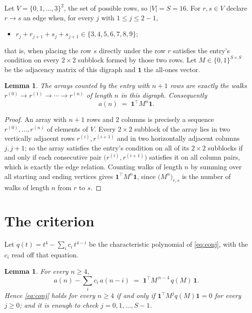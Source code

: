 \documentclass[11pt,a4paper]{article}
\theoremstyle{plain}
\newtheorem{lemma}[theorem]{Lemma}
\theoremstyle{definition}
\begin{document}
Let $V=\{0,1,\dots,3\}^{2}$, the set of possible rows, so $|V|=S=16$. For
$r,s\in V$ declare $r\to s$ an edge when, for every $j$ with $1\le j\le 2-1$,
\begin{itemize}
\item $r_j+r_{j+1}+s_j+s_{j+1}\in\{3, 4, 5, 6, 7, 8, 9\}$;

\end{itemize}
that is, when placing the row $s$ directly under the row $r$ satisfies the entry's
condition on every $2\times2$ subblock formed by those two rows. Let $M\in\{0,1\}^{S\times
S}$ be the adjacency matrix of this digraph and $\mathbf{1}$ the all-ones vector.

\begin{lemma}\label{lem:walk}
The arrays counted by the entry with $n+1$ rows are exactly the walks
$r^{(0)}\to r^{(1)}\to\cdots\to r^{(n)}$ of length $n$ in this digraph. Consequently
\[
a(n)\;=\;\mathbf{1}^{\!\top}M^{n}\mathbf{1} .
\]
\end{lemma}

\begin{proof}
An array with $n+1$ rows and $2$ columns is precisely a sequence
$r^{(0)},\dots,r^{(n)}$ of elements of $V$. Every $2\times2$ subblock of the array lies
in two vertically adjacent rows $r^{(i)},r^{(i+1)}$ and in two horizontally adjacent
columns $j,j+1$; so the array satisfies the entry's condition on all of its $2\times2$
subblocks if and only if each consecutive pair $\bigl(r^{(i)},r^{(i+1)}\bigr)$ satisfies
it on all column pairs, which is exactly the edge relation. Counting walks of length $n$ by
summing over all starting and ending vertices gives
$\mathbf{1}^{\!\top}M^{n}\mathbf{1}$, since
$\bigl(M^{n}\bigr)_{r,s}$ is the number of walks of length $n$ from $r$ to $s$.
\end{proof}

\section{The criterion}

Let $q(t)=t^{4}-\sum_{i}c_i\,t^{4-i}$ be the characteristic polynomial of
\eqref{eq:conj}, with the $c_i$ read off that equation.

\begin{lemma}\label{lem:crit}
For every $n\ge4$,
\[
a(n)-\sum_i c_i\,a(n-i)\;=\;\mathbf{1}^{\!\top}M^{\,n-4}\,q(M)\,\mathbf{1} .
\]
Hence \eqref{eq:conj} holds for every $n\ge4$ if and only if
$\mathbf{1}^{\!\top}M^{j}q(M)\mathbf{1}=0$ for every $j\ge0$; and it is enough to
check $j=0,1,\dots,S-1$.
\end{lemma}
\end{document}
